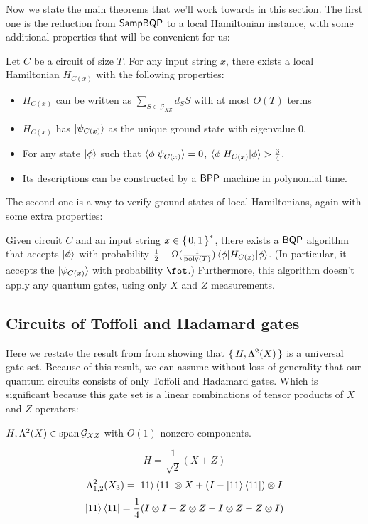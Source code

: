 Now we state the main theorems that we'll work towards in this section.
The first one is the reduction from $\operatorname{\mathsf{SampBQP}}$ to a local Hamiltonian instance, with some additional properties that will be convenient for us:
\begin{thm}
	\label{thm:LHReduction}
	Let $C$ be a circuit of size $T$. For any input string $x$, there exists a local Hamiltonian $H_{C(x)}$  with the following properties:
	\begin{itemize}
		\item $H_{C(x)}$ can be written as $\sum_{S\in\mathcal{G}_{XZ}} d_S S$ with at most $O(T)$ terms
		\item $H_{C(x)}$ has $\ket{\psi_{C(x)}}$ as the unique ground state with eigenvalue $0$.
		\item For any state $\ket\phi$ such that $\braket{\phi|\psi_{C(x)}}=0$,  $\braket{\phi|H_{C(x)}|\phi}>\frac{3}{4}$.
		\item Its descriptions can be constructed by a $\operatorname{\mathsf{BPP}}$ machine in polynomial time.
	\end{itemize}
\end{thm}

The second one is a way to verify ground states of local Hamiltonians, again with some extra properties:
\begin{thm}
	\label{ThmXZCheck}
	Given circuit $C$ and an input string $x\in\set{0,1}^*$, there exists a $\operatorname{\mathsf{BQP}}$ algorithm that accepts $\ket{\phi}$ with probability $\frac{1}{2}-\Omega(\frac{1}{\operatorname*{\operatorname{poly}}(T)})\braket{\phi|H_{C(x)}|\phi}$. (In particular, it accepts the $\ket{\psi_{C(x)}}$ with probability $\fot$.) Furthermore, this algorithm doesn't apply any quantum gates, using only $X$ and $Z$ measurements.
\end{thm}

\subsection{Circuits of Toffoli and Hadamard gates}

Here we restate the result from from \cite{quant-ph/0301040} showing that $\set{H, \Lambda^2(X)}$ is a universal gate set.
Because of this result, we can assume without loss of generality that our quantum circuits consists of only Toffoli and Hadamard gates.
Which is significant because this gate set is a linear combinations of tensor products of $X$ and $Z$ operators:
\begin{thm}
	$H,\Lambda^2(X)\in\operatorname*{\operatorname{span}}\mathcal{G}_{XZ}$ with $O(1)$ nonzero components.
\end{thm}
\begin{prf}
	$$H=\frac{1}{\sqrt{2}}(X+Z)$$
	$$\Lambda^2_{1,2}(X_3)=\ket{11}\bra{11}\otimes X+(I-\ket{11}\bra{11})\otimes I$$
	$$\ket{11}\bra{11}=\frac{1}{4}(I\otimes I+Z\otimes Z-I\otimes Z-Z\otimes I)$$
\end{prf}

